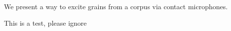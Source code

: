 We present a way to excite grains from a corpus via contact microphones.

This is a test, please ignore